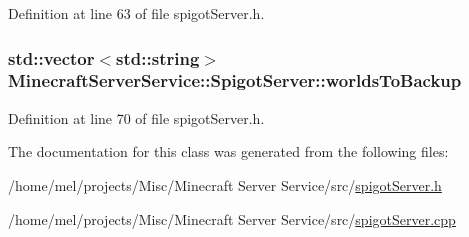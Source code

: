 Definition at line 63 of file spigot\+Server.\+h.

\subsubsection[{\texorpdfstring{worlds\+To\+Backup}{worldsToBackup}}]{\setlength{\rightskip}{0pt plus 5cm}std\+::vector$<$std\+::string$>$ Minecraft\+Server\+Service\+::\+Spigot\+Server\+::worlds\+To\+Backup\hspace{0.3cm}{\ttfamily [protected]}}\hypertarget{class_minecraft_server_service_1_1_spigot_server_a4596e7ae4d2e1a7d2325fb13434f122a}{}\label{class_minecraft_server_service_1_1_spigot_server_a4596e7ae4d2e1a7d2325fb13434f122a}


Definition at line 70 of file spigot\+Server.\+h.



The documentation for this class was generated from the following files\+:\begin{DoxyCompactItemize}
\item 
/home/mel/projects/\+Misc/\+Minecraft Server Service/src/\hyperlink{spigot_server_8h}{spigot\+Server.\+h}\item 
/home/mel/projects/\+Misc/\+Minecraft Server Service/src/\hyperlink{spigot_server_8cpp}{spigot\+Server.\+cpp}\end{DoxyCompactItemize}
